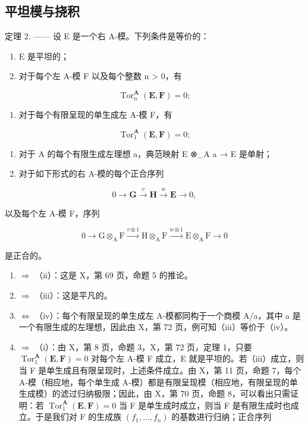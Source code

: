 \subsection{平坦模与挠积}

定理 2. —— 设 E 是一个右 A-模。下列条件是等价的：

\begin{enumerate}
\def\labelenumi{(\roman{enumi})}
\item
  E 是平坦的；
\item
  对于每个左 A-模 F 以及每个整数 n \textgreater{} 0，有
\end{enumerate}

\[
\operatorname{Tor} _ {n} ^ {\mathbf {A}} (\mathbf {E}, \mathbf {F}) = 0;
\]

\begin{enumerate}
\def\labelenumi{(\roman{enumi})}
\setcounter{enumi}{2}
\tightlist
\item
  对于每个有限呈现的单生成左 A-模 F，有
\end{enumerate}

\[
\operatorname{Tor} _ {1} ^ {\mathbf {A}} (\mathbf {E}, \mathbf {F}) = 0;
\]

\begin{enumerate}
\def\labelenumi{(\roman{enumi})}
\setcounter{enumi}{3}
\item
  对于 A 的每个有限生成左理想 a，典范映射 E ⊗\_A a → E 是单射；
\item
  对于如下形式的右 A-模的每个正合序列
\end{enumerate}

\[
0 \rightarrow \mathbf {G} \xrightarrow {v} \mathbf {H} \xrightarrow {w} \mathbf {E} \rightarrow 0,
\]

以及每个左 A-模 F，序列

\[
0 \longrightarrow \mathrm{G} \otimes_ {\mathrm{A}} \mathrm{F} \xrightarrow {v \otimes 1} \mathrm{H} \otimes_ {\mathrm{A}} \mathrm{F} \xrightarrow {w \otimes 1} \mathrm{E} \otimes_ {\mathrm{A}} \mathrm{F} \longrightarrow 0
\]

是正合的。

\begin{enumerate}
\def\labelenumi{(\roman{enumi})}
\item
  \(\Rightarrow\) （ii）：这是 X，第 69 页，命题 5 的推论。
\item
  \(\Rightarrow\) （iii）：这是平凡的。
\item
  \(\Leftrightarrow\) （iv）：每个有限呈现的单生成左 A-模都同构于一个商模 A/a，其中 a 是一个有限生成的左理想，因此由 X，第 72 页，例可知（iii）等价于（iv）。
\item
  \(\Rightarrow\) （i）：由 X，第 8 页，命题 3，X，第 72 页，定理 1，只要 \(\operatorname{Tor}_{1}^{\mathbf{A}}(\mathbf{E},\mathbf{F}) = 0\) 对每个左 A-模 F 成立，E 就是平坦的。若（iii）成立，则当 F 是单生成且有限呈现时，上述条件成立。由 X，第 11 页，命题 7，每个 A-模（相应地，每个单生成 A-模）都是有限呈现模（相应地，有限呈现的单生成模）的滤过归纳极限；因此，由 X，第 70 页，命题 8，可以看出只需证明：若 \(\operatorname{Tor}_{1}^{\mathbf{A}}(\mathbf{E},\mathbf{F}) = 0\) 当 F 是单生成时成立，则当 F 是有限生成时也成立。于是我们对 F 的生成族 \((f_{1},\ldots,f_{n})\) 的基数进行归纳；正合序列
\end{enumerate}

